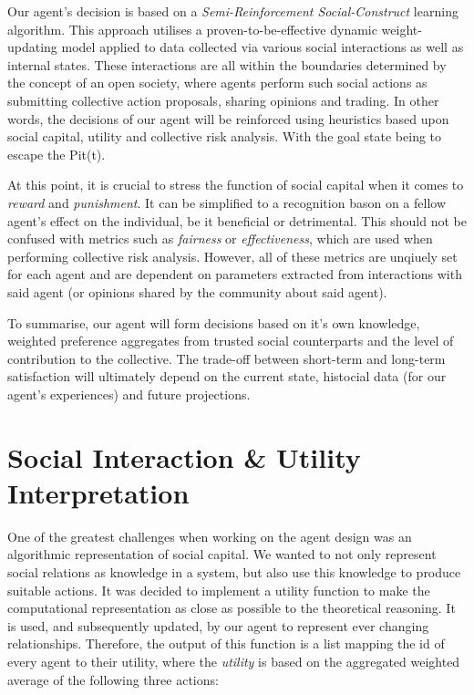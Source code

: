         Our agent's decision is based on a \textit{Semi-Reinforcement Social-Construct} learning algorithm. This approach utilises a proven-to-be-effective dynamic weight-updating model applied to data collected via various social interactions as well as internal states. These interactions are all within the boundaries determined by the concept of an open society, where agents perform such social actions as submitting collective action proposals, sharing opinions and trading. In other words, the decisions of our agent will be reinforced using heuristics based upon social capital, utility and collective risk analysis. With the goal state being to escape the Pit(t). 

        
        At this point, it is crucial to stress the function of social capital when it comes to \textit{reward} and \textit{punishment}. It can be simplified to a recognition bason on a fellow agent's effect on the individual, be it beneficial or detrimental. This should not be confused with metrics such as \textit{fairness} or \textit{effectiveness}, which are used when performing collective risk analysis. However, all of these metrics are unqiuely set for each agent and are dependent on parameters extracted from interactions with said agent (or opinions shared by the community about said agent). 

        To summarise, our agent will form decisions based on it's own knowledge, weighted preference aggregates from trusted social counterparts and the level of contribution to the collective. The trade-off between short-term and long-term satisfaction will ultimately depend on the current state, histocial data (for our agent's experiences) and future projections.  

\section{Social Interaction \& Utility Interpretation}

One of the greatest challenges when working on the agent design was an algorithmic representation of social capital. We wanted to not only represent social relations as knowledge in a system, but also use this knowledge to produce suitable actions. It was decided to implement a utility function to make the computational representation as close as possible to the theoretical reasoning. It is used, and subsequently updated, by our agent to represent ever changing relationships. Therefore, the output of this function is a list mapping the id of every agent to their utility, where the \textit{utility} is based on the aggregated weighted average of the following three actions:
        
